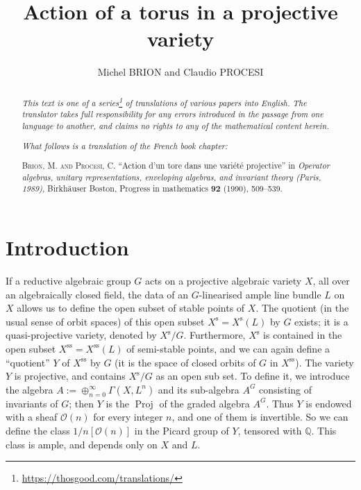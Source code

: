 \documentclass{article}
\title{Action of a torus in a projective variety}
\author{Michel BRION and Claudio PROCESI}
\date{}
\theoremstyle{plain}
\theoremstyle{definition}
\newcommand{\sh}[1]{{\mathscr{#1}}}
\newcommand{\s}{\mathrm{s}}
\renewcommand{\ss}{\mathrm{ss}}
\DeclareMathOperator{\Proj}{Proj}
\begin{document}
\maketitle
\thispagestyle{fancy}

\renewcommand{\abstractname}{Translator's note.}

\begin{abstract}
  \renewcommand*{\thefootnote}{\fnsymbol{footnote}}
  \emph{This text is one of a series\footnote{\url{https://thosgood.com/translations/}} of translations of various papers into English.}
  \emph{The translator takes full responsibility for any errors introduced in the passage from one language to another, and claims no rights to any of the mathematical content herein.}

  \medskip
  
  \emph{What follows is a translation of the French book chapter:}

  \medskip\noindent
  \textsc{Brion, M. and Procesi, C.}
  ``Action d'un tore dans une vari\'{e}t\'{e} projective''
  in \emph{Operator algebras, unitary representations, enveloping algebras, and invariant theory (Paris, 1989)}, Birkh\"{a}user Boston, Progress in mathematics \textbf{92} (1990), 509--539.
\end{abstract}

\setcounter{footnote}{0}

\tableofcontents
\bigskip



\section*{Introduction}
\label{introduction}

If a reductive algebraic group $G$ acts on a projective algebraic variety $X$, all over an algebraically closed field, the data of an $G$-linearised ample line bundle $L$ on $X$ allows us to define the open subset of stable points of $X$.
The quotient (in the usual sense of orbit spaces) of this open subset $X^\s=X^\s(L)$ by $G$ exists;
it is a quasi-projective variety, denoted by $X^\s/G$.
Furthermore, $X^\s$ is contained in the open subset $X^\ss=X^\ss(L)$ of semi-stable points, and we can again define a ``quotient'' $Y$ of $X^\ss$ by $G$ (it is the space of closed orbits of $G$ in $X^\ss$).
The variety $Y$ is projective, and contains $X^\s/G$ as an open sub set.
To define it, we introduce the algebra $A:=\oplus_{n=0}^\infty \Gamma(X,L^n)$ and its sub-algebra $A^G$ consisting of invariants of $G$;
then $Y$ is the $\Proj$ of the graded algebra $A^G$.
Thus $Y$ is endowed with a sheaf $\sh{O}(n)$ for every integer $n$, and one of them is invertible.
So we can define the class $1/n[\sh{O}(n)]$ in the Picard group of $Y$, tensored with $\mathbb{Q}$.
This class is ample, and depends only on $X$ and $L$.
\end{document}
